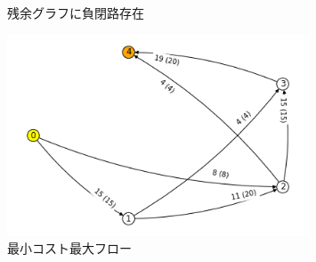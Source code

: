 \documentclass{report}
\begin{document}
\begin{CJK}{UTF8}{min}
\begin{figure}[!h]
        \caption{残余グラフに負閉路存在}
    \end{figure}
    \begin{figure}[!h]
        \centerline{\includegraphics[width=0.8\textwidth]{data/ex12-MF-flow-result.png}}
        \caption{最小コスト最大フロー}
    \end{figure}
\end{CJK}
\end{document}
